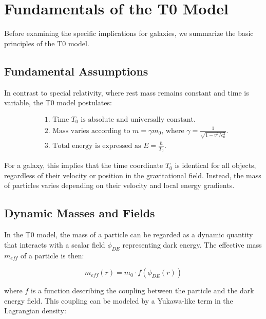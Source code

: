 \documentclass[a4paper,12pt]{article}
\begin{document}
\section{Fundamentals of the T0 Model}

Before examining the specific implications for galaxies, we summarize the basic principles of the T0 model.

\subsection{Fundamental Assumptions}

In contrast to special relativity, where rest mass remains constant and time is variable, the T0 model postulates:

\begin{tcolorbox}[colback=blue!5!white,colframe=blue!75!black,title=Basic Assumptions of the T0 Model]
	\begin{align}
		&\text{1. Time $T_0$ is absolute and universally constant.} \\
		&\text{2. Mass varies according to $m = \gamma m_0$, where $\gamma = \frac{1}{\sqrt{1-v^2/c_0^2}}$.} \\
		&\text{3. Total energy is expressed as $E = \frac{\hbar}{T_0}$.}
	\end{align}
\end{tcolorbox}

For a galaxy, this implies that the time coordinate $T_0$ is identical for all objects, regardless of their velocity or position in the gravitational field. Instead, the mass of particles varies depending on their velocity and local energy gradients.

\subsection{Dynamic Masses and Fields}

In the T0 model, the mass of a particle can be regarded as a dynamic quantity that interacts with a scalar field $\phi_{DE}$ representing dark energy. The effective mass $m_{eff}$ of a particle is then:

\begin{equation}
	m_{eff}(r) = m_0 \cdot f(\phi_{DE}(r))
\end{equation}

where $f$ is a function describing the coupling between the particle and the dark energy field. This coupling can be modeled by a Yukawa-like term in the Lagrangian density:
\end{document}
